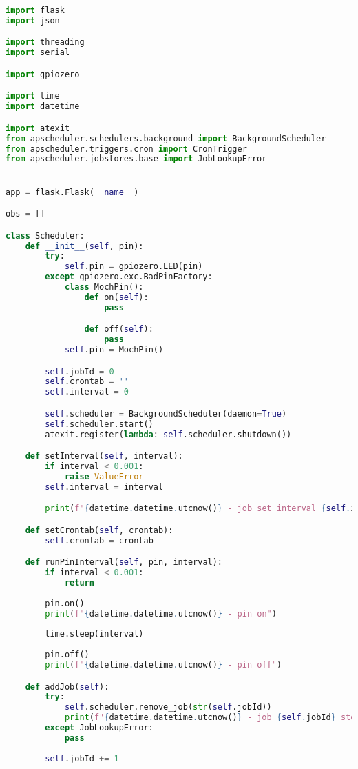 \documentclass[12pt,a4paper,oneside]{book}
\begin{document}
\begin{lstlisting}[title={raspberrypi/api/data.py}, language=Python]
import flask
import json

import threading
import serial

import gpiozero

import time
import datetime

import atexit
from apscheduler.schedulers.background import BackgroundScheduler
from apscheduler.triggers.cron import CronTrigger
from apscheduler.jobstores.base import JobLookupError


app = flask.Flask(__name__)

obs = []

class Scheduler:
    def __init__(self, pin):
        try:
            self.pin = gpiozero.LED(pin)
        except gpiozero.exc.BadPinFactory:
            class MochPin():
                def on(self):
                    pass

                def off(self):
                    pass
            self.pin = MochPin()

        self.jobId = 0
        self.crontab = ''
        self.interval = 0

        self.scheduler = BackgroundScheduler(daemon=True)
        self.scheduler.start()
        atexit.register(lambda: self.scheduler.shutdown())

    def setInterval(self, interval):
        if interval < 0.001:
            raise ValueError
        self.interval = interval

        print(f"{datetime.datetime.utcnow()} - job set interval {self.interval}")

    def setCrontab(self, crontab):
        self.crontab = crontab

    def runPinInterval(self, pin, interval):
        if interval < 0.001:
            return
        
        pin.on()
        print(f"{datetime.datetime.utcnow()} - pin on")
        
        time.sleep(interval)
        
        pin.off()
        print(f"{datetime.datetime.utcnow()} - pin off")

    def addJob(self):
        try:
            self.scheduler.remove_job(str(self.jobId))
            print(f"{datetime.datetime.utcnow()} - job {self.jobId} stopped")
        except JobLookupError:
            pass
        
        self.jobId += 1


\end{lstlisting}
\end{document}
